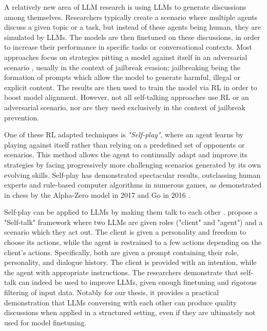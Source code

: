A relatively new area of LLM research is using LLMs to generate discussions among themselves. Researchers typically create a scenario where multiple agents discuss a given topic or a task, but instead of these agents being human, they are simulated by LLMs. The models are then finetuned on these discussions, in order to increase their performance in specific tasks or conversational contexts. Most approaches focus on strategies pitting a model against itself in an adversarial scenario \cite{liu2024largelanguagemodelsagents, cheng2024selfplayingadversariallanguagegame, zheng2024optimalllmalignmentsusing}, usually in the context of jailbreak evasion; jailbreaking being the formation of prompts which allow the model to generate harmful, illegal or explicit content. The results are then used to train the model via \ac{RL} in order to boost model alignment. However, not all self-talking approaches use \ac{RL} or an adversarial scenario, nor are they used exclusively in the context of jailbreak prevention.

One of these \ac{RL} adapted techniques is \textit{"Self-play"}, where an agent learns by playing against itself rather than relying on a predefined set of opponents or scenarios. This method allows the agent to continually adapt and improve its strategies by facing progressively more challenging scenarios generated by its own evolving skills. Self-play has demonstrated spectacular results, outclassing human experts and rule-based computer algorithms in numerous games, as demonstrated in chess by the Alpha-Zero model in 2017 \cite{silver2017masteringchessshogiselfplay} and Go in 2016 \cite{vincent_2019_ai_go}. 

Self-play can be applied to LLMs by making them talk to each other \cite{cheng2024selfplayingadversariallanguagegame}.  \citet{ulmer2024bootstrappingllmbasedtaskorienteddialogue} propose a "Self-talk" framework where two LLMs are given roles ("client" and "agent") and a scenario which they act out. The client is given a personality and freedom to choose its actions, while the agent is restrained to a few actions depending on the client's actions. Specifically, both are given a prompt containing their role, personality, and dialogue history. The client is provided with an intention, while the agent with appropriate instructions. The researchers demonstrate that self-talk can indeed be used to improve LLMs, given enough finetuning and rigorous filtering of input data. Notably for our thesis, it provides a practical demonstration that LLMs conversing with each other can produce quality discussions when applied in a structured setting, even if they are ultimately not used for model finetuning.


